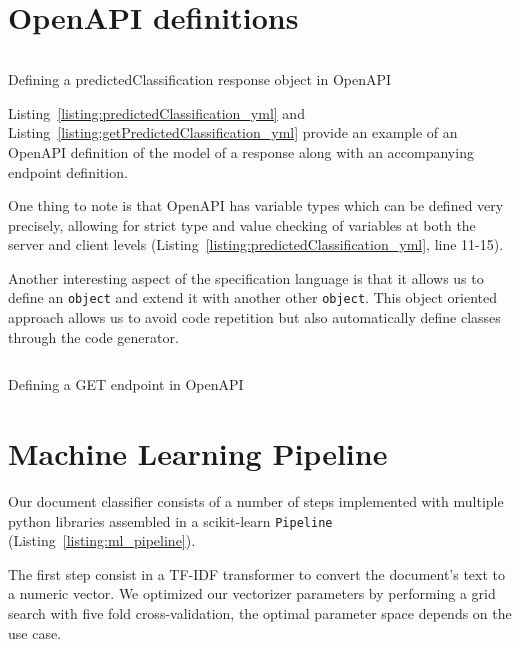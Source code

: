 \documentclass[\version]{l4proj}
\begin{document}


\section{OpenAPI definitions}

\begin{listing}[H]
    \inputminted{yaml}{code/predictedClassification.yml}
    \caption{Defining a predictedClassification response object in OpenAPI}\label{listing:predictedClassification_yml}
\end{listing}

Listing~\ref{listing:predictedClassification_yml} and Listing~\ref{listing:getPredictedClassification_yml} provide an example of an OpenAPI definition of the model of a response along with an accompanying endpoint definition.

One thing to note is that OpenAPI has variable types which can be defined very precisely, allowing for strict type and value checking of variables at both the server and client levels (Listing~\ref{listing:predictedClassification_yml}, line 11-15).

Another interesting aspect of the specification language is that it allows us to define an \verb|object| and extend it with another other \verb|object|.
This object oriented approach allows us to avoid code repetition but also automatically define classes through the code generator.

\begin{listing}[H]
    \inputminted{yaml}{code/getPredictedClassification.yml}
    \caption{Defining a GET endpoint in OpenAPI}\label{listing:getPredictedClassification_yml}
\end{listing}

\section{Machine Learning Pipeline}
Our document classifier consists of a number of steps implemented with multiple python libraries assembled in a scikit-learn \verb|Pipeline| (Listing~\ref{listing:ml_pipeline}).

The first step consist in a TF-IDF transformer to convert the document's text to a numeric vector.
We optimized our vectorizer parameters by performing a grid search with five fold cross-validation, the optimal parameter space depends on the use case.
\end{document}
